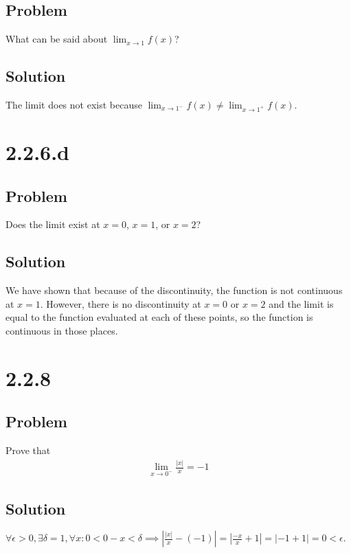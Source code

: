 \documentclass[12pt]{article}
\newcommand{\abs}  [1]{\left|       #1 \right|      }
\begin{document}
\subsection*{Problem}
What can be said about $\lim_{x \to 1} f(x)$?

\subsection*{Solution}
The limit does not exist because $\lim_{x \to 1^-} f(x) \neq \lim_{x \to 1^+} f(x)$.



\section{2.2.6.d}

\subsection*{Problem}
Does the limit exist at $x = 0$, $x = 1$, or $x = 2$?

\subsection*{Solution}
We have shown that because of the discontinuity, the function is not continuous at $x = 1$. However, there is no discontinuity at $x = 0$ or $x = 2$ and the limit is equal to the function evaluated at each of these points, so the function is continuous in those places.



\section*{2.2.8}

\subsection*{Problem}
Prove that
\begin{align*}
    \lim_{x \to 0^-} \frac{\abs{x}}{x} = -1
\end{align*}

\subsection*{Solution}
$\forall \epsilon > 0, \exists \delta = 1, \forall x : 0 < 0 - x < \delta \implies \abs{\frac{\abs{x}}{x} - (-1)} = \abs{\frac{-x}{x} + 1} = \abs{-1 + 1} = 0 < \epsilon$.
\end{document}
